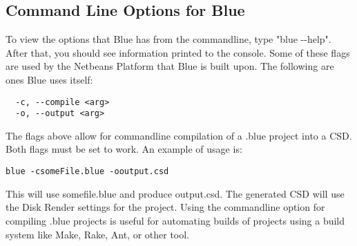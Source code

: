 \subsection{Command Line Options for Blue}\label{commandLine}

To view the options that Blue has from the commandline, type "blue
-\/-help". After that, you should see information printed to the
console. Some of these flags are used by the Netbeans Platform that Blue
is built upon. The following are ones Blue uses itself:

\begin{verbatim}
  -c, --compile <arg>       
  -o, --output <arg>
\end{verbatim}

The flags above allow for commandline compilation of a .blue project
into a CSD. Both flags must be set to work. An example of usage is:

\begin{verbatim}
blue -csomeFile.blue -ooutput.csd
\end{verbatim}

This will use somefile.blue and produce output.csd. The generated CSD
will use the Disk Render settings for the project. Using the commandline
option for compiling .blue projects is useful for automating builds of
projects using a build system like Make, Rake, Ant, or other tool.
